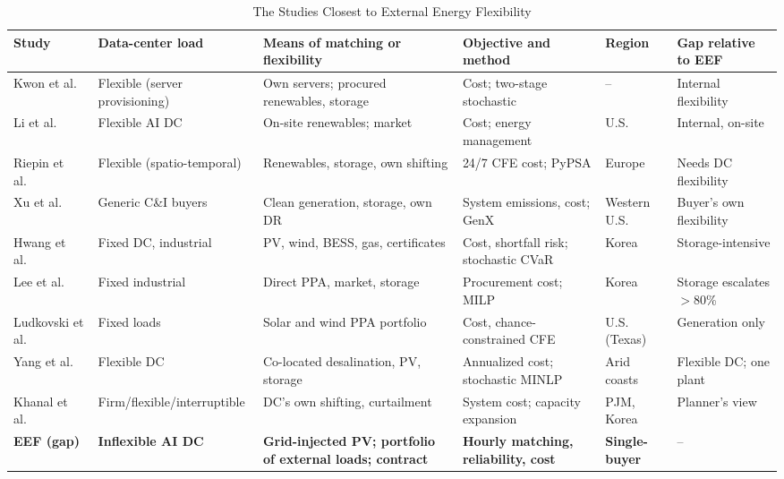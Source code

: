 \documentclass[conference]{IEEEtran}
\begin{document}
\begin{table}[!t]
\caption{The Studies Closest to External Energy Flexibility}
\label{tab:closest}
\centering
\scriptsize
\begin{tabularx}{\textwidth}{@{}L{21mm}L{27mm}YL{38mm}L{15mm}L{27mm}@{}}
\toprule
Study & Data-center load & Means of matching or flexibility & Objective and method & Region & Gap relative to EEF \\
\midrule
Kwon et al.~\cite{r5} & Flexible (server provisioning) & Own servers; procured renewables, storage & Cost; two-stage stochastic & -- & Internal flexibility \\
Li et al.~\cite{r8} & Flexible AI DC & On-site renewables; market & Cost; energy management & U.S. & Internal, on-site \\
Riepin et al.~\cite{r9} & Flexible (spatio-temporal) & Renewables, storage, own shifting & 24/7 CFE cost; PyPSA & Europe & Needs DC flexibility \\
Xu et al.~\cite{r10} & Generic C\&I buyers & Clean generation, storage, own DR & System emissions, cost; GenX & Western U.S. & Buyer's own flexibility \\
Hwang et al.~\cite{r14} & Fixed DC, industrial & PV, wind, BESS, gas, certificates & Cost, shortfall risk; stochastic CVaR & Korea & Storage-intensive \\
Lee et al.~\cite{r15} & Fixed industrial & Direct PPA, market, storage & Procurement cost; MILP & Korea & Storage escalates $>$80\% \\
Ludkovski et al.~\cite{r16} & Fixed loads & Solar and wind PPA portfolio & Cost, chance-constrained CFE & U.S. (Texas) & Generation only \\
Yang et al.~\cite{r22} & Flexible DC & Co-located desalination, PV, storage & Annualized cost; stochastic MINLP & Arid coasts & Flexible DC; one plant \\
Khanal et al.~\cite{r27} & Firm/flexible/interruptible & DC's own shifting, curtailment & System cost; capacity expansion & PJM, Korea & Planner's view \\
\midrule
\textbf{EEF (gap)} & \textbf{Inflexible AI DC} & \textbf{Grid-injected PV; portfolio of external loads; contract} & \textbf{Hourly matching, reliability, cost} & \textbf{Single-buyer} & -- \\
\bottomrule
\end{tabularx}
\end{table}
\end{document}
